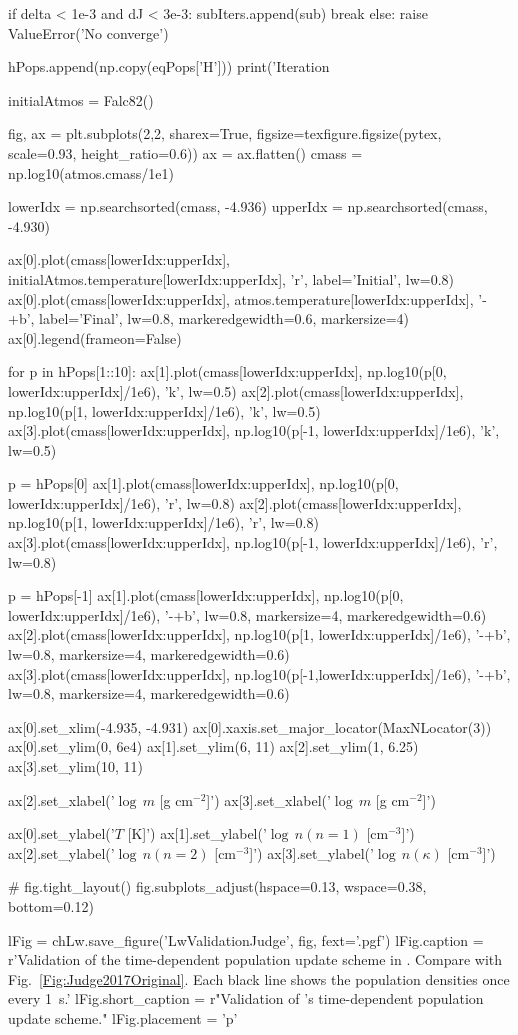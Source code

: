 \begin{pycode}[Lw]
        if delta < 1e-3 and dJ < 3e-3:
            subIters.append(sub)
            break
    else:
        raise ValueError('No converge')

    hPops.append(np.copy(eqPops['H']))
    print('Iteration %


initialAtmos = Falc82()

fig, ax = plt.subplots(2,2, sharex=True, figsize=texfigure.figsize(pytex, scale=0.93, height_ratio=0.6))
ax = ax.flatten()
cmass = np.log10(atmos.cmass/1e1)

lowerIdx = np.searchsorted(cmass, -4.936)
upperIdx = np.searchsorted(cmass, -4.930)

ax[0].plot(cmass[lowerIdx:upperIdx], initialAtmos.temperature[lowerIdx:upperIdx], 'r', label='Initial', lw=0.8)
ax[0].plot(cmass[lowerIdx:upperIdx], atmos.temperature[lowerIdx:upperIdx], '-+b', label='Final', lw=0.8, markeredgewidth=0.6, markersize=4)
ax[0].legend(frameon=False)

for p in hPops[1::10]:
    ax[1].plot(cmass[lowerIdx:upperIdx], np.log10(p[0, lowerIdx:upperIdx]/1e6), 'k', lw=0.5)
    ax[2].plot(cmass[lowerIdx:upperIdx], np.log10(p[1, lowerIdx:upperIdx]/1e6), 'k', lw=0.5)
    ax[3].plot(cmass[lowerIdx:upperIdx], np.log10(p[-1, lowerIdx:upperIdx]/1e6), 'k', lw=0.5)

p = hPops[0]
ax[1].plot(cmass[lowerIdx:upperIdx], np.log10(p[0, lowerIdx:upperIdx]/1e6), 'r', lw=0.8)
ax[2].plot(cmass[lowerIdx:upperIdx], np.log10(p[1, lowerIdx:upperIdx]/1e6), 'r', lw=0.8)
ax[3].plot(cmass[lowerIdx:upperIdx], np.log10(p[-1, lowerIdx:upperIdx]/1e6), 'r', lw=0.8)

p = hPops[-1]
ax[1].plot(cmass[lowerIdx:upperIdx], np.log10(p[0, lowerIdx:upperIdx]/1e6),  '-+b', lw=0.8, markersize=4, markeredgewidth=0.6)
ax[2].plot(cmass[lowerIdx:upperIdx], np.log10(p[1, lowerIdx:upperIdx]/1e6),  '-+b', lw=0.8, markersize=4, markeredgewidth=0.6)
ax[3].plot(cmass[lowerIdx:upperIdx], np.log10(p[-1,lowerIdx:upperIdx]/1e6), '-+b', lw=0.8, markersize=4, markeredgewidth=0.6)

ax[0].set_xlim(-4.935, -4.931)
ax[0].xaxis.set_major_locator(MaxNLocator(3))
ax[0].set_ylim(0, 6e4)
ax[1].set_ylim(6, 11)
ax[2].set_ylim(1, 6.25)
ax[3].set_ylim(10, 11)

ax[2].set_xlabel('$\log\,m$ [g cm$^{-2}$]')
ax[3].set_xlabel('$\log\,m$ [g cm$^{-2}$]')

ax[0].set_ylabel('$T$ [K]')
ax[1].set_ylabel('$\log\,n(n=1)$ [cm$^{-3}$]')
ax[2].set_ylabel('$\log\,n(n=2)$ [cm$^{-3}$]')
ax[3].set_ylabel('$\log\,n(\kappa)$ [cm$^{-3}$]')

# fig.tight_layout()
fig.subplots_adjust(hspace=0.13, wspace=0.38, bottom=0.12)

lFig = chLw.save_figure('LwValidationJudge', fig, fext='.pgf')
lFig.caption = r'Validation of the time-dependent population update scheme in \Lw{}. Compare with Fig.~\ref{Fig:Judge2017Original}. Each black line shows the population densities once every \SI{1}{\second}.'
lFig.short_caption = r"Validation of \Lw{}'s time-dependent population update scheme."
lFig.placement = 'p'
\end{pycode}

